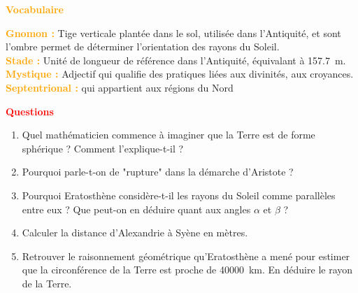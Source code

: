 \documentclass[a4paper,11pt,fleqn]{article}%
\begin{document}
\noindent \begin{minipage}{.5\linewidth}
    \begin{center}\textcolor{orange}{\textbf{Vocabulaire}}\end{center}
\textcolor{orange}{\textbf{Gnomon : }} Tige verticale plantée dans le sol, utilisée dans l'Antiquité, et sont l'ombre permet de déterminer l'orientation des rayons du Soleil.\\
\textcolor{orange}{\textbf{Stade : }} Unité de longueur de référence dans l'Antiquité, équivalant à \SI{157,7}{m}.\\
\textcolor{orange}{\textbf{Mystique :}} Adjectif qui qualifie des pratiques liées aux divinités, aux croyances.\\
\textcolor{orange}{\textbf{Septentrional :}} qui appartient aux régions du Nord
\end{minipage}
\begin{minipage}{.5\linewidth}
\begin{center}\textcolor{red}{\textbf{Questions}} \end{center}
\begin{enumerate}
	\item Quel mathématicien commence à imaginer que la Terre est de forme sphérique ? Comment l'explique-t-il ?
	\item Pourquoi parle-t-on de "rupture" dans la démarche d'Aristote ?
	\item Pourquoi Eratosthène considère-t-il les rayons du Soleil comme parallèles entre eux ? Que peut-on en déduire quant aux angles $\alpha$ et $\beta$ ?
	\item Calculer la distance d'Alexandrie à Syène en mètres.
	\item Retrouver le raisonnement géométrique qu'Eratosthène a mené pour estimer que la circonférence de la Terre est proche de \SI{40000}{km}. En déduire le rayon de la Terre.
\end{enumerate}
\end{minipage}
\end{document}

